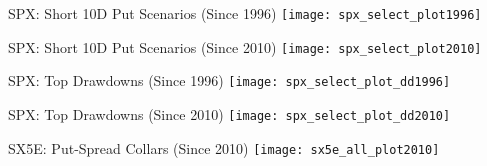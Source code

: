 \documentclass{beamer}
\begin{document}
\begin{frame}{SPX: Short 10D Put Scenarios (Since 1996)}
\texttt{[image: spx\_select\_plot1996]}
\end{frame}

\begin{frame}{SPX: Short 10D Put Scenarios (Since 2010)}
\texttt{[image: spx\_select\_plot2010]}
\end{frame}

\begin{frame}{SPX: Top Drawdowns (Since 1996)}
\texttt{[image: spx\_select\_plot\_dd1996]}
\end{frame}

\begin{frame}{SPX: Top Drawdowns (Since 2010)}
\texttt{[image: spx\_select\_plot\_dd2010]}
\end{frame}

\begin{frame}{SX5E: Put-Spread Collars (Since 2010)}
\texttt{[image: sx5e\_all\_plot2010]}
\end{frame}
\end{document}
